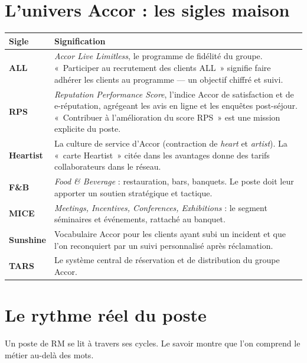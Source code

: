 \documentclass[11pt,a4paper]{article}
\newcommand{\terme}[1]{\textcolor{bleusof}{\textbf{#1}}}
\begin{document}
\section{L'univers Accor : les sigles maison}

\begin{center}
\footnotesize\renewcommand{\arraystretch}{1.06}
\begin{tabularx}{\textwidth}{@{}L{2.6cm} X@{}}
\toprule
{}\textbf{Sigle} & \textbf{Signification} \\
\midrule
\terme{ALL} & \emph{Accor Live Limitless}, le programme de fidélité du groupe. «~Participer au recrutement des clients ALL~» signifie faire adhérer les clients au programme --- un objectif chiffré et suivi. \\
\terme{RPS} & \emph{Reputation Performance Score}, l'indice Accor de satisfaction et de e-réputation, agrégeant les avis en ligne et les enquêtes post-séjour. «~Contribuer à l'amélioration du score RPS~» est une mission explicite du poste. \\
\terme{Heartist} & La culture de service d'Accor (contraction de \emph{heart} et \emph{artist}). La «~carte Heartist~» citée dans les avantages donne des tarifs collaborateurs dans le réseau. \\
\terme{F\&B} & \emph{Food \& Beverage} : restauration, bars, banquets. Le poste doit leur apporter un soutien stratégique et tactique. \\
\terme{MICE} & \emph{Meetings, Incentives, Conferences, Exhibitions} : le segment séminaires et événements, rattaché au banquet. \\
\terme{Sunshine} & Vocabulaire Accor pour les clients ayant subi un incident et que l'on reconquiert par un suivi personnalisé après réclamation. \\
\terme{TARS} & Le système central de réservation et de distribution du groupe Accor. \\
\bottomrule
\end{tabularx}
\end{center}

\section{Le rythme réel du poste}

Un poste de RM se lit à travers ses cycles. Le savoir montre que l'on comprend le métier au-delà des mots.
\end{document}
